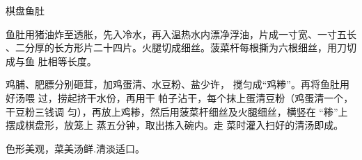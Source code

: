 \begin{recipe}{棋盘鱼肚}

\ingredients


\preparation

\step 鱼肚用猪油炸至透胀，先入冷水，再入温热水内漂净浮油，片成一寸宽、一寸五长
、二分厚的长方形片二十四片。火腿切成细丝。菠菜杆每根撕为六根细丝，用刀切成与鱼
肚相等长度。

鸡脯、肥膘分别砸茸，加鸡蛋清、水豆粉、盐少许， 搅匀成“鸡糁”。再将鱼肚用好汤喂
过，捞起挤干水份，再用干 帕子沾干，每个抹上蛋清豆粉（鸡蛋清一个，干豆粉三钱调
匀），再放上鸡糁，然后用菠菜杆细丝及火腿细丝，横竖在 “糁”上摆成棋盘形，放笼上
蒸五分钟，取出拣入碗内。走 菜时灌入扫好的清汤即成。

\features

色形美观，菜美汤鲜.清淡适口。

\end{recipe}

